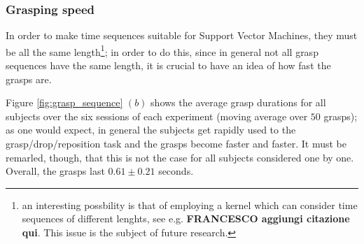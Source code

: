 \subsubsection{Grasping speed}

In order to make time sequences suitable for Support Vector Machines,
they must be all the same length\footnote{an interesting possbility is
that of employing a kernel which can consider time sequences of
different lenghts, see e.g. \cite{} {\bf FRANCESCO aggiungi citazione
qui}. This issue is the subject of future research.}; in order to do
this, since in general not all grasp sequences have the same length,
it is crucial to have an idea of how fast the grasps are.

Figure \ref{fig:grasp_sequence} $(b)$ shows the average grasp
durations for all subjects over the six sessions of each experiment
(moving average over $50$ grasps); as one would expect, in general the
subjects get rapidly used to the grasp/drop/reposition task and the
grasps become faster and faster. It must be remarled, though, that
this is not the case for all subjects considered one by one. Overall,
the grasps last $0.61 \pm 0.21$ seconds.
